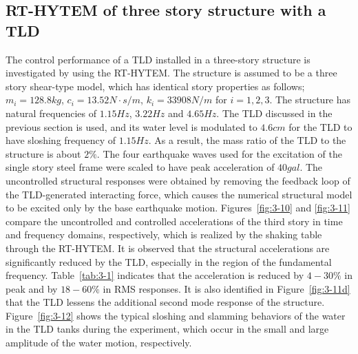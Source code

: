 \clearpage
\subsection{RT-HYTEM of three story structure with a TLD}
The control performance of a TLD installed in a three-story structure is investigated by using the RT-HYTEM. The structure is assumed to be a three story shear-type model, which has identical story properties as follows; $m_{i}=128.8kg$, $c_{i}=13.52N\cdot s/m$, $k_{i}=33908N/m$ for $i=1,2,3$. The structure has natural frequencies of $1.15Hz$, $3.22Hz$ and $4.65Hz$. The TLD discussed in the previous section is used, and its water level is modulated to $4.6cm$ for the TLD to have sloshing frequency of $1.15Hz$. As a result, the mass ratio of the TLD to the structure is about $2\%$. The four earthquake waves used for the excitation of the single story steel frame were scaled to have peak acceleration of $40gal$. The uncontrolled structural responses were obtained by removing the feedback loop of the TLD-generated interacting force, which causes the numerical structural model to be excited only by the base earthquake motion. 
Figures~\ref{fig:3-10} and \ref{fig:3-11} compare the uncontrolled and controlled accelerations of the third story in time and frequency domains, respectively, which is realized by the shaking table through the RT-HYTEM. It is observed that the structural accelerations are significantly reduced by the TLD, especially in the region of the fundamental frequency. Table~\ref{tab:3-1} indicates that the acceleration is reduced by $4-30\%$ in peak and by $18-60\%$ in RMS responses. It is also identified in Figure~\ref{fig:3-11d} that the TLD lessens the additional second mode response of the structure. Figure~\ref{fig:3-12} shows the typical sloshing and slamming behaviors of the water in the TLD tanks during the experiment, which occur in the small and large amplitude of the water motion, respectively\citep{yalla2001liquid}.

